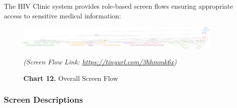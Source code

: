 \documentclass[12pt,a4paper]{article}
\begin{document}
The HIV Clinic system provides role-based screen flows ensuring appropriate access to sensitive medical information:


\begin{figure}[H]
    \centering
    \includegraphics[width=0.9\textwidth]{diagrams/user_interface_flow.svg}
    \caption*{\textbf{Chart 12.} Overall Screen Flow}

    \vspace{0.5em}
    {\color{blue}\textit{(Screen Flow Link: \href{https://tinyurl.com/3hhmmk6x}{https://tinyurl.com/3hhmmk6x})}}
\end{figure}




\subsubsection{Screen Descriptions}
\end{document}
